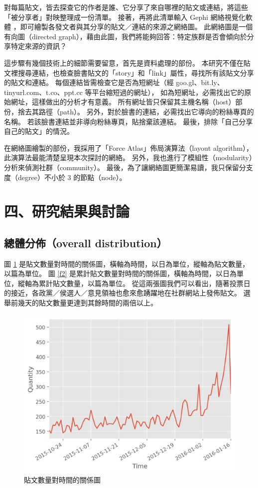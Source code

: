 \documentclass[letterpaper, 10pt, conference]{ieeeconf}   %
\begin{document}
\begin{CJK}{UTF8}{bsmi}
對每篇貼文，皆去探查它的作者是誰、它分享了來自哪裡的貼文或連結，將這些「被分享者」對映整理成一份清單。%
接著，再將此清單輸入 Gephi 網絡視覺化軟體 \cite{c15}，即可繪製各發文者與其分享的貼文／連結的來源之網絡圖。%
此網絡圖是一個有向圖（directed graph），藉由此圖，我們將能夠回答：特定族群是否會傾向於分享特定來源的資訊？%

這步驟有幾個技術上的細節需要留意，首先是資料處理的部份。%
本研究不僅在貼文裡搜尋連結，也檢查臉書貼文的「story」和「link」屬性，尋找所有該貼文分享的貼文和連結。%
每個連結皆需檢查它是否為短網址（經 goo.gl、bit.ly、tinyurl.com、t.co、ppt.cc 等平台縮短過的網址），%
如為短網址，必需找出它的原始網址，這樣做出的分析才有意義。%
所有網址皆只保留其主機名稱（host）部份，捨去其路徑（path）。%
另外，對於臉書的連結，必需找出它導向的粉絲專頁的名稱。%
若該臉書連結並非導向粉絲專頁，貼捨棄該連結。%
最後，排除「自己分享自己的貼文」的情況。%

在網絡圖繪製的部份，我採用了「Force Atlas」佈局演算法（layout algorithm），此演算法最能清楚呈現本次探討的網絡。%
另外，我也進行了模組性（modularity）分析來偵測社群（community）。%
最後，為了讓網絡圖更簡潔易讀，我只保留分支度（degree）不小於 3 的節點（node）。%

\section*{四、研究結果與討論}

\subsection*{總體分佈（overall distribution）}

圖 \ref{f1} 是貼文數量對時間的關係圖，橫軸為時間，以日為單位，縱軸為貼文數量，以篇為單位。%
圖 \ref{f2} 是累計貼文數量對時間的關係圖，橫軸為時間，以日為單位，縱軸為累計貼文數量，以篇為單位。%
從這兩張圖我們可以看出，隨著投票日的接近，各政黨／侯選人／意見領袖也愈來愈踴躍地在社群網站上發佈貼文。%
選舉前幾天的貼文數量更達到其餘時間的兩倍以上。%

\begin{figure}[!htbp]
\centering
\includegraphics[width=\columnwidth]{quantity_time_graph}
\caption{貼文數量對時間的關係圖}
\label{f1}
\end{figure}


\end{CJK}
\end{document}
